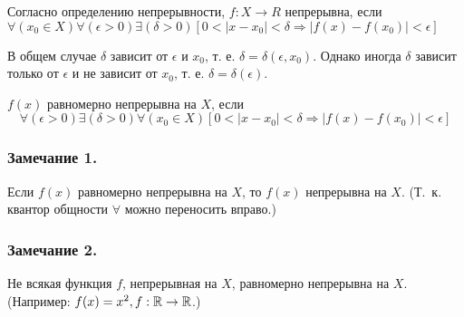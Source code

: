 Согласно определению непрерывности,
$f:X \to R$ непрерывна, если 
$\forall(x_0 \in X) \forall(\epsilon >0) \exists(\delta>0)[0<|x-x_0|<\delta \Rightarrow |f(x)-f(x_0)|<\epsilon] $

В общем случае $\delta$ зависит от $\epsilon$ и $x_0$, т. е. $\delta=\delta(\epsilon,x_0)$.
Однако иногда $\delta$ зависит только от $\epsilon$ и не зависит от $x_0$, т. е. $\delta=\delta(\epsilon)$.

\opred
$f(x)$ равномерно непрерывна на $X$, если
$$ \forall(\epsilon >0) \exists(\delta>0) \forall(x_0 \in X) [0<|x-x_0|<\delta \Rightarrow |f(x)-f(x_0)|<\epsilon] $$

\subsubsection{Замечание 1.}
Если $f(x)$ равномерно непрерывна на $X$, то $f(x)$ непрерывна на $X$.
(Т.~к. квантор общности $\forall$ можно переносить вправо.)

\subsubsection{Замечание 2.}
Не всякая функция $f$, непрерывная на $X$, равномерно непрерывна на $X$.
(Например: $f(x)=x^2, f:\mathbb{R} \to \mathbb{R}$.)

